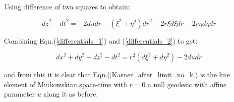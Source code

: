\noindent Using difference of two squares to obtain:

\begin{equation}\label{differentials_2}
{dz}^2 - {dt}^2 = -2 {du}{dr} - (\xi^2 + \eta^2) {dr}^2 - 2 r \xi {d\xi}{dr} - 2 r \eta {d\eta}{dr}
\end{equation}

\noindent Combining Eqn.(\ref{differentials_1}) and (\ref{differentials_2}) to get:

\begin{equation*}
{dx}^2 + {dy}^2 + {dz}^2 - {dt}^2 = r^2 ({d\xi}^2 + {d\eta}^2) - 2 {du}{dr}
\end{equation*}

\noindent and from this it is clear that Eqn.(\ref{Kasner_after_limit_no_k}) is the line element of Minkowskian space-time with $r = 0$ a null geodesic with affine parameter $u$ along it as before. 
